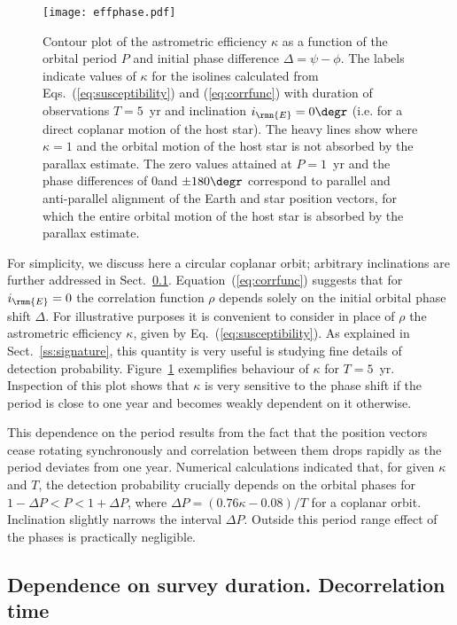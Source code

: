 \documentclass[fleqn,usenatbib,useAMS,usedcolumn]{mnras}
\begin{document}
\begin{figure}
  \centering
  \texttt{[image: effphase.pdf]}
 \caption{Contour plot of the astrometric efficiency $\kappa$ as a function of the orbital period $P$ and initial phase difference $\Delta=\psi-\phi$. The labels indicate values of $\kappa$ for the isolines calculated from Eqs.~(\ref{eq:susceptibility}) and (\ref{eq:corrfunc}) with duration of observations $T=5$~yr and inclination $i_\rmn{E}=0\degr$ (i.e. for a direct coplanar motion of the host star). The heavy lines show where $\kappa=1$ and the orbital motion of the host star is not absorbed by the parallax estimate. The zero values attained at $P=1$~yr and the phase differences of 0\degr and $\pm 180\degr$ correspond to parallel and anti-parallel alignment of the Earth and star position vectors, for which the entire orbital motion of the host star is absorbed by the parallax estimate.}
 \label{fig:phase}
\end{figure}

For simplicity, we discuss here a circular coplanar orbit; arbitrary inclinations are further addressed in Sect.~\ref{ss:long-observations}. Equation~(\ref{eq:corrfunc}) suggests that for $i_\rmn{E}=0$ the correlation function $\rho$ depends solely on the initial orbital phase shift $\Delta$. For illustrative purposes it is convenient to consider in place of $\rho$ the astrometric efficiency $\kappa$, given by Eq.~(\ref{eq:susceptibility}). As explained in Sect.~\ref{ss:signature}, this quantity is very useful is studying fine details of detection probability. Figure~\ref{fig:phase} exemplifies behaviour of $\kappa$ for $T=5$~yr. Inspection of this plot shows that $\kappa$ is very sensitive to the phase shift if the period is close to one year and becomes weakly dependent on it otherwise.

This dependence on the period results from the fact that the position vectors cease rotating synchronously and correlation between them drops rapidly as the period deviates from one year. Numerical calculations indicated that, for given $\kappa$ and $T$, the detection probability crucially depends on the orbital phases for $1-\Delta P<P<1+\Delta P$, where $\Delta P=\left(0.76\kappa-0.08\right)/T$ for a coplanar orbit. Inclination slightly narrows the interval $\Delta P$. Outside this period range effect of the phases is practically negligible.

\subsection{Dependence on survey duration. Decorrelation time}
\label{ss:long-observations}
\end{document}
